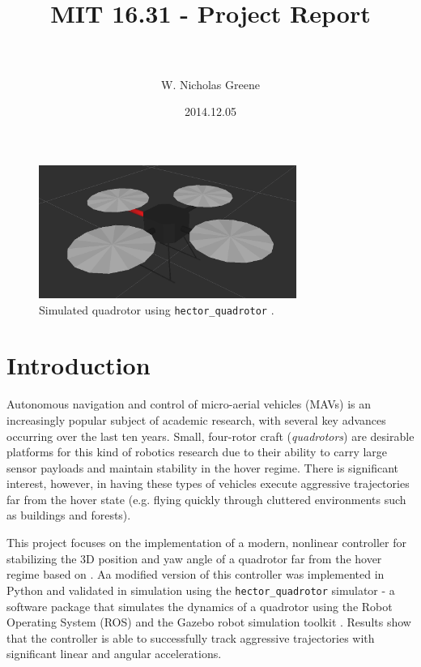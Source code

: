 \documentclass[paper=letter, fontsize=11pt]{scrartcl} %
\title{
\normalfont \normalsize
\horrule{0.5pt} \\[0.4cm] %
\huge MIT 16.31 - Project Report \\ %
\horrule{2pt} \\[0.5cm] %
}
\author{W. Nicholas Greene} %
\date{\normalsize2014.12.05} %
\numberwithin{equation}{section} %
\numberwithin{figure}{section} %
\numberwithin{table}{section} %
\begin{document}
\maketitle %


\begin{figure}[h]
  \centering
  \includegraphics[width=0.75\textwidth]{quadrotor_screenshot_cropped}
  \caption{Simulated quadrotor using \texttt{hector\_quadrotor} \cite{2012simpar_meyer}.}
\end{figure}

\section{Introduction}
Autonomous navigation and control of micro-aerial vehicles (MAVs) is an increasingly popular
subject of academic research, with several key advances occurring over the last ten years.
Small, four-rotor craft (\textit{quadrotors}) are desirable platforms for this kind of
robotics research due to their ability to carry large sensor payloads and maintain stability
in the hover regime. There is significant interest, however, in having these types of vehicles
execute aggressive trajectories far from the hover state (e.g. flying quickly through
cluttered environments such as buildings and forests).

This project focuses on the implementation of a modern, nonlinear controller for stabilizing the
3D position and yaw angle of a quadrotor far from the hover regime based on \cite{lee2010geometric}.
Aa modified version of this controller was implemented in Python and validated
in simulation using the \texttt{hector\_quadrotor} simulator - a software package that simulates the
dynamics of a quadrotor using the Robot Operating System (ROS) and the Gazebo robot
simulation toolkit \cite{2012simpar_meyer, quigley2009ros, koenig2004design}. Results
show that the controller is able to successfully track aggressive trajectories with
significant linear and angular accelerations.
\end{document}
